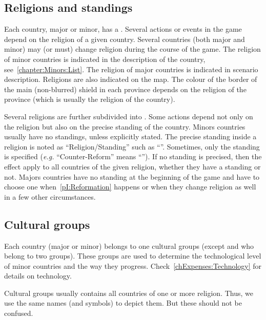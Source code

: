 \label{chThePowers:Religions}



\subsection{Religions and standings}

\aparag Each country, major or minor, has a .
\bparag Several actions or events in the game depend on the religion of a
given country.
\bparag Several countries (both major and minor) may (or must) change religion
during the course of the game.
\bparag The religion of minor countries is indicated in the description of the
country, see~\ref{chapter:Minors:List}. The religion of major countries is
indicated in scenario description.
\bparag Religions are also indicated on the map. The colour of the border of
the main (non-blurred) shield in each province depends on the religion of the
province (which is usually the religion of the country).

\aparag Several religions are further subdivided into . Some
actions depend not only on the religion but also on the precise standing of
the country.
\bparag Minors countries usually have no standings, unless explicitly stated.
\bparag The precise standing inside a religion is noted as
``Religion/Standing'' such as ``\CATHCR''. Sometimes, only the standing is
specified (\emph{e.g.} ``Counter-Reform'' means ``\CATHCR'').
\bparag If no standing is precised, then the effect apply to all countries of
the given religion, whether they have a standing or not.
\bparag Majors countries have no standing at the beginning of the game and
have to choose one when~\ref{pI:Reformation} happens or when they change
religion as well in a few other circumstances.



\subsection{Cultural groups}

\aparag Each country (major or minor) belongs to one cultural groups (except
\POL and \RUS who belong to two groups).
\bparag These groups are used to determine the technological level of minor
countries and the way they progress. Check~\ref{chExpenses:Technology} for
details on technology.

\aparag Cultural groups usually contains all countries of one or more
religion. Thus, we use the same names (and symbols) to depict them. But these
should not be confused.

